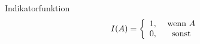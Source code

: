 Indikatorfunktion
$$
    I(A)=\left\{\begin{array}{c c}
        1, & \text{ wenn } A \\
        0, & \text{ sonst}
    \end{array}\right.
$$